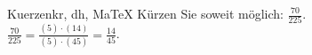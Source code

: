 \begin{MAufgabe}{Kuerzen}{kr, dh, MaTeX}
K\"urzen Sie soweit m\"oglich: $\frac{70}{225}$.\\ 
\ifLsg\MLoesung
\quad $\frac{70}{225}=\frac{(5)\cdot(14)}{(5)\cdot(45)}=\frac{14}{45}$.\else\relax\fi
 \end{MAufgabe}